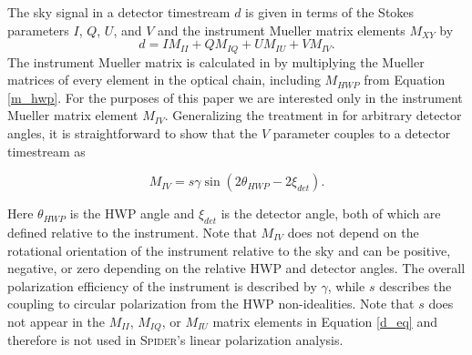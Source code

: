 \documentclass[twocolumn]{aastex61}
\begin{document}
The sky signal in a detector timestream $d$ is given in terms of the Stokes parameters $I$, $Q$, $U$, and $V$ and the instrument Mueller matrix elements $M_{XY}$ by
\begin{equation}\label{d_eq}
d = IM_{II} + QM_{IQ} + UM_{IU} + VM_{IV}.
\end{equation}
The instrument Mueller matrix is calculated in \citet{bryan2010modeling} by multiplying the Mueller matrices of every element in the optical chain, including $M_{HWP}$ from Equation \ref{m_hwp}.  For the purposes of this paper we are interested only in the instrument Mueller matrix element $M_{IV}$.  Generalizing the treatment in \citet{bryan2010modeling} for arbitrary detector angles, it is straightforward to show that the $V$ parameter couples to a detector timestream as

\begin{equation}\label{MIV}
M_{IV} = s\gamma \sin(2\theta_{HWP} - 2 \xi_{det}).
\end{equation}

Here $\theta_{HWP}$ is the HWP angle and $\xi_{det}$ is the detector angle, both of which are defined relative to the instrument.  Note that $M_{IV}$ does not depend on the rotational orientation of the instrument relative to the sky and can be positive, negative, or zero depending on the relative HWP and detector angles.  The overall polarization efficiency of the instrument is described by $\gamma$, while $s$ describes the coupling to circular polarization from the HWP non-idealities.  Note that $s$ does not appear in the $M_{II}$, $M_{IQ}$, or $M_{IU}$ matrix elements in Equation \ref{d_eq} and therefore is not used in \textsc{Spider}'s linear polarization analysis.
\end{document}
